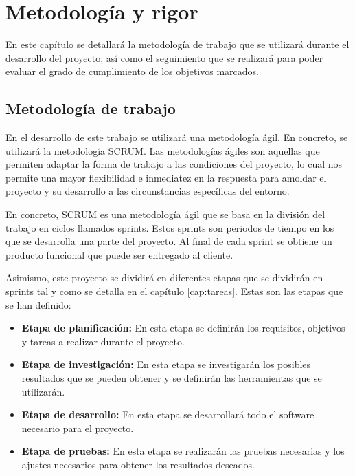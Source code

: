 \chapter{Metodología y rigor}
\label{cap:metodologia}


En este capítulo se detallará la metodología de trabajo que se utilizará durante el desarrollo
del proyecto, así como el seguimiento que se realizará para poder evaluar el grado de cumplimiento
de los objetivos marcados.

\section{Metodología de trabajo}
\label{sec:metodologia:metodologia_trabajo}


En el desarrollo de este trabajo se utilizará una metodología ágil. En concreto, se utilizará 
la metodología SCRUM. Las metodologías ágiles son aquellas que permiten adaptar la forma de
trabajo a las condiciones del proyecto, lo cual nos permite una mayor flexibilidad e 
inmediatez en la respuesta para amoldar el proyecto y su desarrollo a las circunstancias
específicas del entorno.

En concreto, SCRUM es una metodología ágil que se basa en la división del trabajo en ciclos
llamados sprints. Estos sprints son periodos de tiempo en los que se desarrolla una parte
del proyecto. Al final de cada sprint se obtiene un producto funcional que puede ser entregado
al cliente. \cite{MetodoAgile}

Asimismo, este proyecto se dividirá en diferentes etapas que se dividirán en sprints tal y
como se detalla en el capítulo \ref{cap:tareas}. Estas son las etapas que se han definido:

\begin{itemize}
    \item \textbf{Etapa de planificación:} En esta etapa se definirán los requisitos, 
    objetivos y tareas a realizar durante el proyecto.
    \item \textbf{Etapa de investigación:} En esta etapa se investigarán los posibles 
    resultados que se pueden obtener y se definirán las herramientas que se utilizarán.
    \item \textbf{Etapa de desarrollo:} En esta etapa se desarrollará todo el software 
    necesario para el proyecto.
    \item \textbf{Etapa de pruebas:} En esta etapa se realizarán las pruebas necesarias y los 
    ajustes necesarios para obtener los resultados deseados.
\end{itemize}

